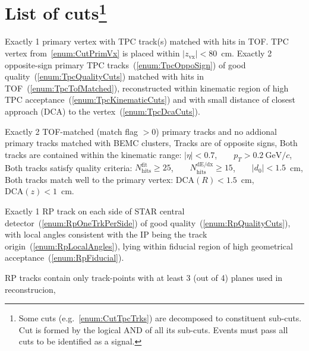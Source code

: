 \section[List of cuts]{List of cuts\footnote{Some cuts (e.g.~\ref{enum:CutTpcTrks}) are decomposed to constituent sub-cuts. Cut is formed by the logical AND of all its sub-cuts. Events must pass all cuts to be identified as a signal.}}\label{sec:listOfCuts}
\begin{enumerate}[label=\textbf{C\arabic*},ref=C\arabic*]
 \itemm Exactly 1 primary vertex with TPC track(s) matched with hits in TOF.\label{enum:CutPrimVx}
 \itemm TPC vertex from~\ref{enum:CutPrimVx} is placed within $|z_{\text{vx}}|<80$~cm.\label{enum:CutZVx}
 \itemm Exactly 2 opposite-sign primary TPC tracks~(\ref{enum:TpcOppoSign}) of good quality~(\ref{enum:TpcQualityCuts}) matched with hits in TOF~(\ref{enum:TpcTofMatched}), reconstructed within kinematic region of high TPC acceptance~(\ref{enum:TpcKinematicCuts}) and with small distance of closest approach (DCA) to the vertex~(\ref{enum:TpcDcaCuts}).\label{enum:CutTpcTrks}
    \begin{enumerate}[label=\textbf{\theenumi.\arabic*},ref=\theenumi.\arabic*]
      \itemm Exactly 2 TOF-matched (match flag $>0$) primary tracks and no addional primary tracks matched with BEMC clusters,\label{enum:TpcTofMatched}
      \itemm Tracks are of opposite signs,\label{enum:TpcOppoSign}
      \itemm Both tracks are contained within the kinematic range:\label{enum:TpcKinematicCuts}\hspace*{13pt}
      $|\eta|<0.7$,~~~~$p_{T}>0.2~\text{GeV}/c$,
      \itemm Both tracks satisfy quality criteria:\label{enum:TpcQualityCuts}\hspace*{100pt}
      $N_{\text{hits}}^{\text{fit}}\geq25$,~~~~$N_{\text{hits}}^{\text{dE/dx}}\geq15$,~~~~$|d_{0}|<1.5$~cm,
      \itemm Both tracks match well to the primary vertex:\label{enum:TpcDcaCuts}\hspace*{47pt}
      $\text{DCA}(R)<1.5$~cm,~~~~$\text{DCA}(z)<1$~cm.
    \end{enumerate}
 \itemm Exactly 1 RP track on each side of STAR central detector~(\ref{enum:RpOneTrkPerSide}) of good quality~(\ref{enum:RpQualityCuts}), with local angles consistent with the IP being the track origin~(\ref{enum:RpLocalAngles}), lying within fiducial region of high geometrical acceptance~(\ref{enum:RpFiducial}).\label{enum:CutRpTrks}
      \begin{enumerate}[label=\textbf{\theenumi.\arabic*},ref=\theenumi.\arabic*]
      \itemm RP tracks contain only track-points with at least 3 (out of 4) planes used in reconstrucion,\label{enum:RpQualityCuts}

\end{enumerate}
\end{enumerate}
